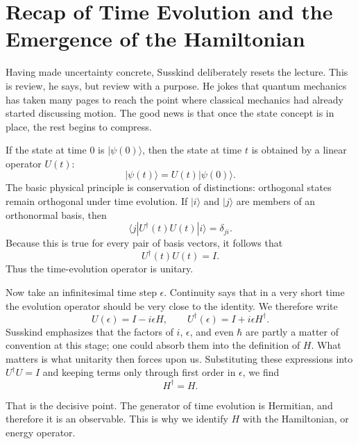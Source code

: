 \section{Recap of Time Evolution and the Emergence of the Hamiltonian}

Having made uncertainty concrete, Susskind deliberately resets the lecture. This is review, he says, but review with a purpose. He jokes that quantum mechanics has taken many pages to reach the point where classical mechanics had already started discussing motion. The good news is that once the state concept is in place, the rest begins to compress.

If the state at time \(0\) is \(|\psi(0)\rangle\), then the state at time \(t\) is obtained by a linear operator \(U(t)\):
\begin{equation}
|\psi(t)\rangle = U(t)|\psi(0)\rangle.
\end{equation}
The basic physical principle is conservation of distinctions: orthogonal states remain orthogonal under time evolution. If \(|i\rangle\) and \(|j\rangle\) are members of an orthonormal basis, then
\begin{equation}
\langle j|U^\dagger(t)U(t)|i\rangle = \delta_{ji}.
\end{equation}
Because this is true for every pair of basis vectors, it follows that
\begin{equation}
U^\dagger(t)U(t)=I.
\end{equation}
Thus the time-evolution operator is unitary.

Now take an infinitesimal time step \(\epsilon\). Continuity says that in a very short time the evolution operator should be very close to the identity. We therefore write
\begin{equation}
U(\epsilon)=I-i\epsilon H,
\qquad
U^\dagger(\epsilon)=I+i\epsilon H^\dagger.
\end{equation}
Susskind emphasizes that the factors of \(i\), \(\epsilon\), and even \(\hbar\) are partly a matter of convention at this stage; one could absorb them into the definition of \(H\). What matters is what unitarity then forces upon us. Substituting these expressions into \(U^\dagger U=I\) and keeping terms only through first order in \(\epsilon\), we find
\begin{equation}
H^\dagger=H.
\end{equation}

That is the decisive point. The generator of time evolution is Hermitian, and therefore it is an observable. This is why we identify \(H\) with the Hamiltonian, or energy operator.

